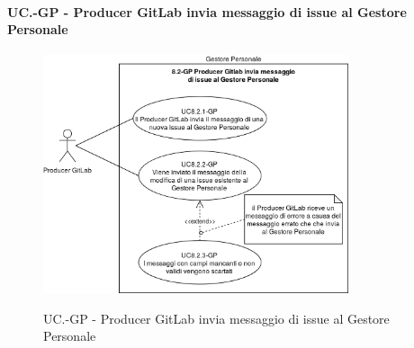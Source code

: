 	\paragraph{UC\theuccount.\thesubuccount-GP -  Producer GitLab invia messaggio di issue al Gestore Personale}
		\begin{figure}[H]
			\centering
			\includegraphics[width=0.8\textwidth]{img/casi_d'uso/UC8_2.png}\\
			\caption{UC\theuccount.\thesubuccount-GP -  Producer GitLab invia messaggio di issue al Gestore Personale}
		\end{figure}
